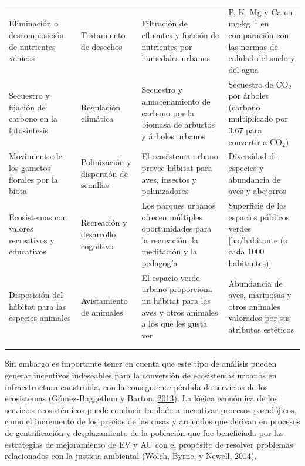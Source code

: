 \documentclass[12pt,a4paper,oneside, openany]{book}
\theoremstyle{definition}
\theoremstyle{definition}
\theoremstyle{definition}
\theoremstyle{remark}
\begin{document}
\begin{landscape}
\begin{table}[t]
\begin{tabular}{>{\raggedright\arraybackslash}p{5cm}>{\raggedright\arraybackslash}p{4.5cm}>{\raggedright\arraybackslash}p{6cm}>{\raggedright\arraybackslash}p{7cm}}
Eliminación o descomposición de nutrientes xénicos & Tratamiento de desechos & Filtración de efluentes y fijación de nutrientes por humedales urbanos & P, K, Mg y Ca en mg$\cdot$kg$^{-1}$ en comparación con las normas de calidad del suelo y del agua\\
Secuestro y fijación de carbono en la fotosíntesis & Regulación climática & Secuestro y almacenamiento de carbono por la biomasa de arbustos y árboles urbanos & Secuestro de CO$_2$ por árboles (carbono multiplicado por 3.67 para convertir a CO$_2$)\\
Movimiento de los gametos florales por la biota & Polinización y dispersión de semillas & El ecosistema urbano provee hábitat para aves, insectos y polinizadores & Diversidad de especies y abundancia de aves y abejorros\\
Ecosistemas con valores recreativos y educativos & Recreación y desarrollo cognitivo & Los parques urbanos ofrecen múltiples oportunidades para la recreación, la meditación y la pedagogía & Superficie de los espacios públicos verdes [ha/habitante (o cada 1000 habitantes)]\\
\addlinespace
Disposición del hábitat para las especies animales & Avistamiento de animales & El espacio verde urbano proporciona un hábitat para las aves y otros animales a los que les gusta ver & Abundancia de aves, mariposas y otros animales valorados por sus atributos estéticos\\
\bottomrule
\multicolumn{4}{l}{\textit{Fuente}}\\
\multicolumn{4}{l}{Gómez-Baggethun y Barton
(\protect\hyperlink{ref-gomez-baggethun_classifying_2013}{2013})}\\
\end{tabular}
\end{table}
\end{landscape}

Sin embargo es importante tener en cuenta que este tipo de análisis
pueden generar incentivos indeseables para la conversión de ecosistemas
urbanos en infraestructura construida, con la consiguiente pérdida de
servicios de los ecosistemas (Gómez-Baggethun y Barton,
\protect\hyperlink{ref-gomez-baggethun_classifying_2013}{2013}). La
lógica económica de los servicios ecosistémicos puede conducir también a
incentivar procesos paradójicos, como el incremento de los precios de
las casas y arriendos que derivan en procesos de gentrificación y
desplazamiento de la población que fue beneficiada por las estrategias
de mejoramiento de EV y AU con el propósito de resolver problemas
relacionados con la justicia ambiental (Wolch, Byrne, y Newell,
\protect\hyperlink{ref-wolch_urban_2014}{2014}).
\end{document}
